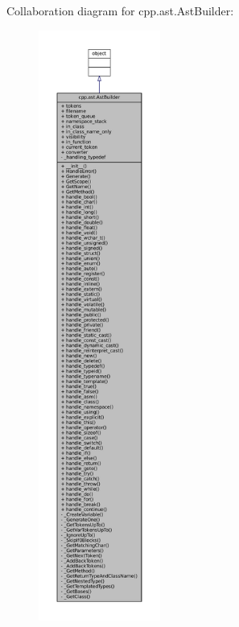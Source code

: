 Collaboration diagram for cpp.\+ast.\+Ast\+Builder\+:
\nopagebreak
\begin{figure}[H]
\begin{center}
\leavevmode
\includegraphics[height=550pt]{classcpp_1_1ast_1_1AstBuilder__coll__graph}
\end{center}
\end{figure}
